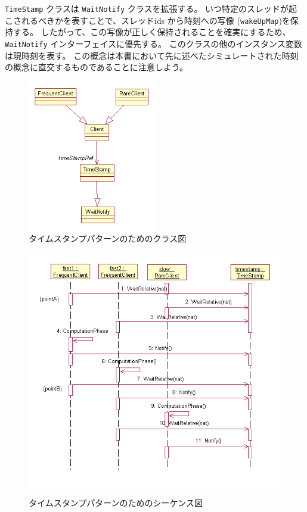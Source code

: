 \documentclass[\pformat,12pt]{jreport}
\begin{document}
 \texttt{TimeStamp} クラスは \texttt{WaitNotify} クラスを拡張する。
いつ特定のスレッドが起こされるべきかを表すことで、スレッドids から時刻への写像 (\texttt{wakeUpMap})を保持する。
したがって、この写像が正しく保持されることを確実にするため、 \texttt{WaitNotify} インターフェイスに優先する。
このクラスの他のインスタンス変数は現時刻を表す。
この概念は本書において先に述べたシミュレートされた時刻の概念に直交するものであることに注意しよう。

\begin{figure}
\begin{center}
\includegraphics[width=0.5\textwidth]{timestamp}
\end{center}
\caption{タイムスタンプパターンのためのクラス図\label{fig:classtimestamp}}
\end{figure}

\begin{figure}
\begin{center}
\includegraphics[width=\textwidth]{timestampseqdiag}
\end{center}
\caption{タイムスタンプパターンのためのシーケンス図\label{fig:seqdiagtimestamp}}
\end{figure}
\end{document}
